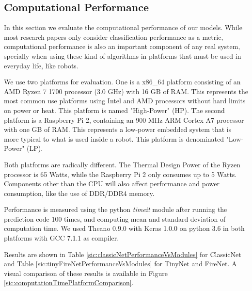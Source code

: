 \subsection{Computational Performance}
\label{sic:compPerformanceSection}

In this section we evaluate the computational performance of our models. While most research papers only consider classification performance as a metric, computational performance is also an important component of any real system, specially when using these kind of algorithms in platforms that must be used in everyday life, like robots.

We use two platforms for evaluation. One is a x86\_64 platform consisting of an AMD Ryzen 7 1700 processor (3.0 GHz) with 16 GB of RAM. This represents the most common use platforms using Intel and AMD processors without hard limits on power or heat. This platform is named "High-Power" (HP). The second platform is a Raspberry Pi 2, containing an 900 MHz ARM Cortex A7 processor with one GB of RAM. This represents a low-power embedded system that is more typical to what is used inside a robot. This platform is denominated "Low-Power" (LP).

Both platforms are radically different. The Thermal Design Power of the Ryzen processor is 65 Watts, while the Raspberry Pi 2 only consumes up to 5 Watts. Components other than the CPU will also affect performance and power consumption, like the use of DDR/DDR4 memory.

Performance is measured using the python \textit{timeit} module after running the prediction code 100 times, and computing mean and standard deviation of computation time. We used Theano 0.9.0 with Keras 1.0.0 on python 3.6 in both platforms with GCC 7.1.1 as compiler.

Results are shown in Table \ref{sic:classicNetPerformanceVsModules} for ClassicNet and Table \ref{sic:tinyFireNetPerformanceVsModules} for TinyNet and FireNet. A visual comparison of these results is available in Figure \ref{sic:computationTimePlatformComparison}.

